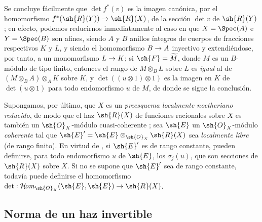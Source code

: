 \documentclass[oneside,10pt]{amsart}
\makeatletter
\newcommand{\ega@arrow}[2]{\mathchoice{#1}{#2}{#2}{#2}}
\renewcommand{\to}{\ega@arrow{\longrightarrow}{\rightarrow}}
\def\shHom{\mathcal{H}\!\mathit{om}}
\let\EGAOriginalLabel\label
\renewcommand{\label}[1]{\phantomsection\EGAOriginalLabel{#1}}
\makeatother
\begin{document}
\begin{env}[6.4.9]
Se concluye fácilmente que $\det f^*(v)$ es la imagen canónica, por el homomorfismo $f^*(\sh{R}(Y))\to\sh{R}(X)$, de la sección $\det v$ de $\sh{R}(Y)$;
en efecto, podemos reducirnos inmediatamente al caso en que $X=\Spec(A)$ e $Y=\Spec(B)$ son afines, siendo $A$ y $B$ anillos íntegros de cuerpos de fracciones respectivos $K$ y $L$, y siendo el homomorfismo $B\to A$ inyectivo y extendiéndose, por tanto, a un monomorfismo $L\to K$;
si $\sh{F}=\widetilde{M}$, donde $M$ es un $B$-módulo de tipo finito, entonces el rango de $M\otimes_B L$ sobre $L$ es \emph{igual} al de $(M\otimes_B A)\otimes_A K$ sobre $K$, y $\det((u\otimes1)\otimes1)$ es la imagen en $K$ de $\det(u\otimes1)$ para todo endomorfismo $u$ de $M$, de donde se sigue la conclusión.
\end{env}

\begin{env}[6.4.10]
\label{II.6.4.10}
Supongamos, por último, que $X$ es un \emph{preesquema localmente noetheriano reducido}, de modo que el haz $\sh{R}(X)$ de funciones racionales sobre $X$ es también un $\sh{O}_X$-módulo cuasi-coherente ;
sea $\sh{E}$ un $\sh{O}_X$-módulo \emph{coherente} tal que $\sh{E}'=\sh{E}\otimes_{\sh{O}_X}\sh{R}(X)$ sea \emph{localmente libre} (de rango finito).
En virtud de , si $\sh{E}'$ es de rango constante, pueden definirse, para todo endomorfismo $u$ de $\sh{E}$, los $\sigma_j(u)$, que son secciones de $\sh{R}(X)$ sobre $X$.
Si no se supone que $\sh{E}'$ sea de rango constante, todavía puede definirse el homomorfismo $\det:\shHom_{\sh{O}_X}(\sh{E},\sh{E})\to\sh{R}(X)$.
\end{env}

\subsection{Norma de un haz invertible}
\label{subsection:II.6.5}
\end{document}
